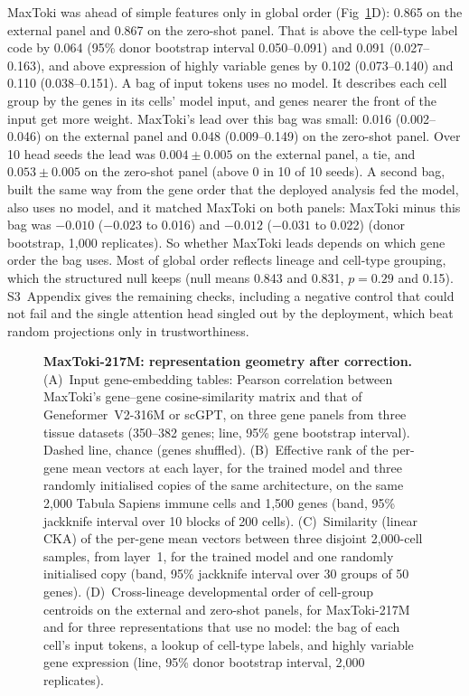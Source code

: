 \documentclass[10pt,letterpaper]{article}
\begin{document}
MaxToki was ahead of simple features only in global order
(Fig~\ref{fig:caseGeom}D): 0.865 on the external panel and 0.867 on the
zero-shot panel. That is above the cell-type label code by 0.064 (95\%
donor bootstrap interval 0.050--0.091) and 0.091 (0.027--0.163), and
above expression of highly variable genes by 0.102 (0.073--0.140) and
0.110 (0.038--0.151). A bag of input tokens uses no model. It describes
each cell group by the genes in its cells' model input, and genes nearer
the front of the input get more weight. MaxToki's lead over this bag was
small: 0.016 (0.002--0.046) on the external panel and 0.048
(0.009--0.149) on the zero-shot panel. Over 10 head seeds the lead was
$0.004 \pm 0.005$ on the external panel, a tie, and $0.053 \pm 0.005$ on
the zero-shot panel (above 0 in 10 of 10 seeds). A second bag, built the
same way from the gene order that the deployed analysis fed the model,
also uses no model, and it matched MaxToki on both panels: MaxToki minus
this bag was $-0.010$ ($-0.023$ to 0.016) and $-0.012$ ($-0.031$ to
0.022) (donor bootstrap, 1,000 replicates). So whether MaxToki leads
depends on which gene order the bag uses. Most of global order
reflects lineage and cell-type grouping, which the structured null keeps
(null means 0.843 and 0.831, $p = 0.29$ and 0.15). S3~Appendix gives the
remaining checks, including a negative control that could not fail and
the single attention head singled out by the deployment, which beat
random projections only in trustworthiness.

\begin{figure}[H]
\caption{\textbf{MaxToki-217M: representation geometry after correction.}
(A)~Input gene-embedding tables: Pearson correlation between MaxToki's
gene--gene cosine-similarity matrix and that of Geneformer~V2-316M or
scGPT, on three gene panels from three tissue datasets (350--382 genes;
line, 95\% gene bootstrap interval). Dashed line, chance (genes
shuffled). (B)~Effective rank of the per-gene mean vectors at each layer,
for the trained model and three randomly initialised copies of the same
architecture, on the same 2,000 Tabula Sapiens immune cells and 1,500
genes (band, 95\% jackknife interval over 10 blocks of 200 cells).
(C)~Similarity (linear CKA) of the per-gene mean vectors between three
disjoint 2,000-cell samples, from layer~1, for the trained model and one
randomly initialised copy (band, 95\% jackknife interval over 30 groups
of 50 genes). (D)~Cross-lineage developmental order of cell-group
centroids on the external and zero-shot panels, for MaxToki-217M and for
three representations that use no model: the bag of each cell's input
tokens, a lookup of cell-type labels, and highly variable gene
expression (line, 95\% donor bootstrap interval, 2,000 replicates).}
\label{fig:caseGeom}
\end{figure}
\end{document}

